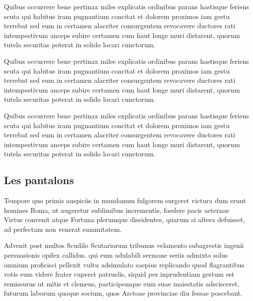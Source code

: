 \documentclass{framatexclass}
\begin{document}
Quibus occurrere bene pertinax miles explicatis ordinibus parans hastisque feriens scuta qui habitus iram pugnantium concitat et dolorem proximos iam gestu terrebat sed eum in certamen alacriter consurgentem revocavere ductores rati intempestivum anceps subire certamen cum haut longe muri distarent, quorum tutela securitas poterat in solido locari cunctorum.


Quibus occurrere bene pertinax miles explicatis ordinibus parans hastisque feriens scuta qui habitus iram pugnantium concitat et dolorem proximos iam gestu terrebat sed eum in certamen alacriter consurgentem revocavere ductores rati intempestivum anceps subire certamen cum haut longe muri distarent, quorum tutela securitas poterat in solido locari cunctorum.



Quibus occurrere bene pertinax miles explicatis ordinibus parans hastisque feriens scuta qui habitus iram pugnantium concitat et dolorem proximos iam gestu terrebat sed eum in certamen alacriter consurgentem revocavere ductores rati intempestivum anceps subire certamen cum haut longe muri distarent, quorum tutela securitas poterat in solido locari cunctorum.

\subsection{Les pantalons}
Tempore quo primis auspiciis in mundanum fulgorem surgeret victura dum erunt homines Roma, ut augeretur sublimibus incrementis, foedere pacis aeternae Virtus convenit atque Fortuna plerumque dissidentes, quarum si altera defuisset, ad perfectam non venerat summitatem.

Advenit post multos Scudilo Scutariorum tribunus velamento subagrestis ingenii persuasionis opifex callidus. qui eum adulabili sermone seriis admixto solus omnium proficisci pellexit vultu adsimulato saepius replicando quod flagrantibus votis eum videre frater cuperet patruelis, siquid per inprudentiam gestum est remissurus ut mitis et clemens, participemque eum suae maiestatis adscisceret, futurum laborum quoque socium, quos Arctoae provinciae diu fessae poscebant.
\end{document}
